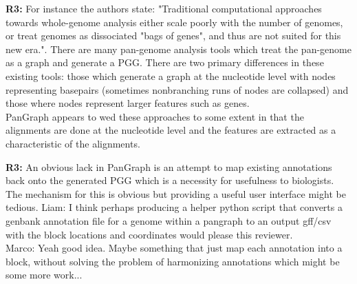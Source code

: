 \documentclass[aps,rmp,onecolumn]{revtex4-1}
\newcommand{\Marco}[1]{{\color{gray}Marco: #1}}
\newcommand{\Liam}[1]{{\color{teal}Liam: #1}}
\newcommand{\reviewer}[2]{\textbf{#1:} #2\vskip 5mm}
\begin{document}
\reviewer{R3}{For instance the authors state: "Traditional computational approaches towards whole-genome analysis either scale poorly with the number of genomes, or treat genomes as dissociated "bags of genes", and thus are not suited for this new era.". There are many pan-genome analysis tools which treat the pan-genome as a graph and generate a PGG. There are two primary differences in these existing tools: those which generate a graph at the nucleotide level with nodes representing basepairs (sometimes nonbranching runs of nodes are collapsed) and those where nodes represent larger features such as genes.\\
      PanGraph appears to wed these approaches to some extent in that the alignments are done at the nucleotide level and the features are extracted as a characteristic of the alignments.}

\reviewer{R3}{An obvious lack in PanGraph is an attempt to map existing annotations back onto the generated PGG which is a necessity for usefulness to biologists. The mechanism for this is obvious but providing a useful user interface might be tedious.}
\Liam{I think perhaps producing a helper python script that converts a genbank annotation file for a genome within a pangraph to an output gff/csv with the block locations and coordinates would please this reviewer.}\\
\Marco{Yeah good idea. Maybe something that just map each annotation into a block, without solving the problem of harmonizing annotations which might be some more work...}\\
\end{document}
